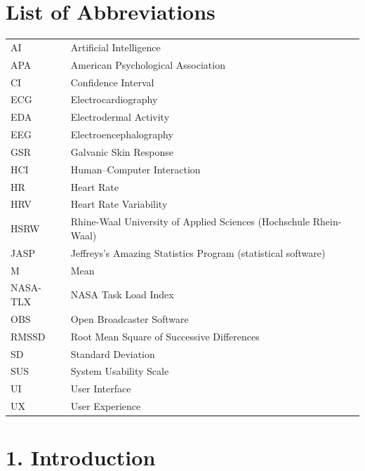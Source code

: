 \documentclass[
]{article}
\begin{document}
\clearpage
\tableofcontents
\clearpage

\clearpage
\hypertarget{list-of-abbreviations}{%
\section{List of Abbreviations}\label{list-of-abbreviations}}

\begin{longtable}[]{@{}p{}p{}@{}}
AI & Artificial Intelligence \\
APA & American Psychological Association \\
CI & Confidence Interval \\
ECG & Electrocardiography \\
EDA & Electrodermal Activity \\
EEG & Electroencephalography \\
GSR & Galvanic Skin Response \\
HCI & Human--Computer Interaction \\
HR & Heart Rate \\
HRV & Heart Rate Variability \\
HSRW & Rhine-Waal University of Applied Sciences (Hochschule Rhein-Waal) \\
JASP & Jeffreys's Amazing Statistics Program (statistical software) \\
M & Mean \\
NASA-TLX & NASA Task Load Index \\
OBS & Open Broadcaster Software \\
RMSSD & Root Mean Square of Successive Differences \\
SD & Standard Deviation \\
SUS & System Usability Scale \\
UI & User Interface \\
UX & User Experience \\
\end{longtable}


\clearpage
\hypertarget{list-of-figures-list-of-tables}{}%
\listoffigures
{}
\listoftables




\clearpage
{}
\clearpage
\hypertarget{introduction}{%
\section{1. Introduction}\label{introduction}}
\end{document}

